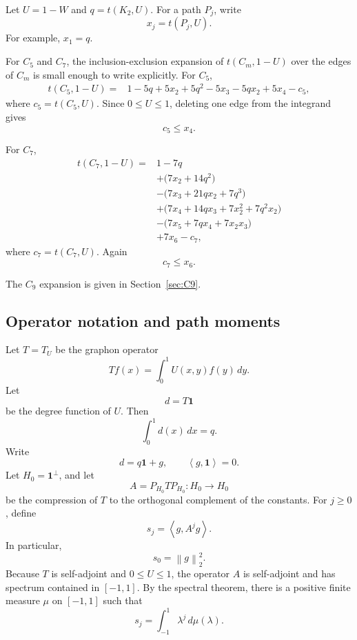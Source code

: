\documentclass[11pt]{article}
\newcommand{\one}{\mathbf 1}
\newcommand{\ip}[2]{\left\langle #1,#2\right\rangle}
\newcommand{\norm}[1]{\left\|#1\right\|}
\begin{document}
Let $U=1-W$ and $q=t(K_2,U)$.  For a path $P_j$, write
\[
        x_j=t(P_j,U).
\]
For example, $x_1=q$.

For $C_5$ and $C_7$, the inclusion-exclusion expansion of $t(C_m,1-U)$ over the edges of $C_m$ is small enough to write explicitly.  For $C_5$,
\begin{equation}\label{eq:C5-expansion}
\begin{aligned}
    t(C_5,1-U)
    ={}&1-5q+5x_2+5q^2-5x_3-5qx_2+5x_4-c_5,
\end{aligned}
\end{equation}
where $c_5=t(C_5,U)$.  Since $0\le U\le 1$, deleting one edge from the integrand gives
\[
        c_5\le x_4.
\]

For $C_7$,
\begin{equation}\label{eq:C7-expansion}
\begin{aligned}
    t(C_7,1-U)
    ={}&1-7q \\
    &+\bigl(7x_2+14q^2\bigr)\\
    &-\bigl(7x_3+21qx_2+7q^3\bigr)\\
    &+\bigl(7x_4+14qx_3+7x_2^2+7q^2x_2\bigr)\\
    &-\bigl(7x_5+7qx_4+7x_2x_3\bigr)\\
    &+7x_6-c_7,
\end{aligned}
\end{equation}
where $c_7=t(C_7,U)$.  Again
\[
        c_7\le x_6.
\]

The $C_9$ expansion is given in Section~\ref{sec:C9}.

\subsection{Operator notation and path moments}\label{subsec:operator}

Let $T=T_U$ be the graphon operator
\[
        Tf(x)=\int_0^1 U(x,y)f(y)\,dy.
\]
Let
\[
        d=T\one
\]
be the degree function of $U$.  Then
\[
        \int_0^1 d(x)\,dx=q.
\]
Write
\[
        d=q\one+g,
        \qquad
        \ip{g}{\one}=0.
\]
Let $H_0=\one^\perp$, and let
\[
        A=P_{H_0}TP_{H_0}:H_0\to H_0
\]
be the compression of $T$ to the orthogonal complement of the constants.  For $j\ge0$, define
\[
        s_j=\ip{g}{A^jg}.
\]
In particular,
\[
        s_0=\norm{g}_2^2.
\]
Because $T$ is self-adjoint and $0\le U\le 1$, the operator $A$ is self-adjoint and has spectrum contained in $[-1,1]$.  By the spectral theorem, there is a positive finite measure $\mu$ on $[-1,1]$ such that
\[
        s_j=\int_{-1}^1 \lambda^j\,d\mu(\lambda).
\]
\end{document}
